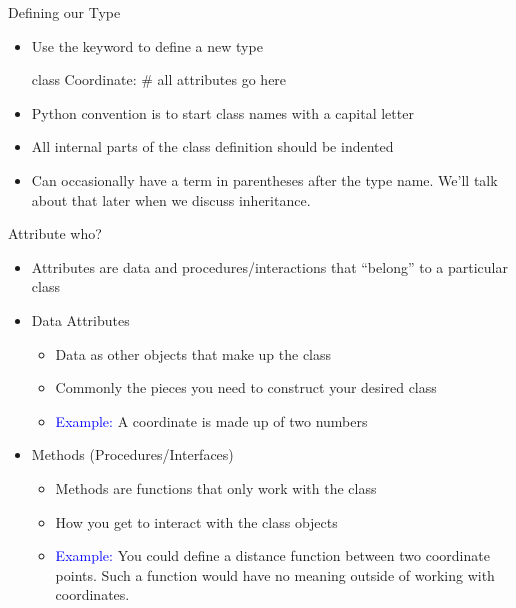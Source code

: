 \documentclass[pdf, aspectratio=169, 12pt]{beamer}
\begin{document}
\begin{frame}[fragile]{Defining our Type}
	\begin{itemize}
		\item Use the  keyword to define a new type
			\begin{pythoncode}
				class Coordinate:
					# all attributes go here
			\end{pythoncode}
		\item Python convention is to start class names with a capital letter
		\item All internal parts of the class definition should be indented
		\item Can occasionally have a term in parentheses after the type name. We'll talk about that later when we discuss inheritance.
	\end{itemize}
\end{frame}

\begin{frame}{Attribute who?}
	\begin{itemize}
		\item Attributes are data and procedures/interactions that ``belong'' to a particular class
		\item \alert{Data Attributes}
			\begin{itemize}
				\item Data as other objects that make up the class
				\item Commonly the pieces you need to construct your desired class
				\item \textcolor{Blue}{Example:} A coordinate is made up of two numbers
			\end{itemize}
		\item \alert{Methods} (Procedures/Interfaces)
			\begin{itemize}
				\item Methods are functions that only work with the class
				\item How you get to interact with the class objects
				\item \textcolor{Blue}{Example:} You could define a distance function between two coordinate points. Such a function would have no meaning outside of working with coordinates.
			\end{itemize}
	\end{itemize}
\end{frame}
\end{document}
